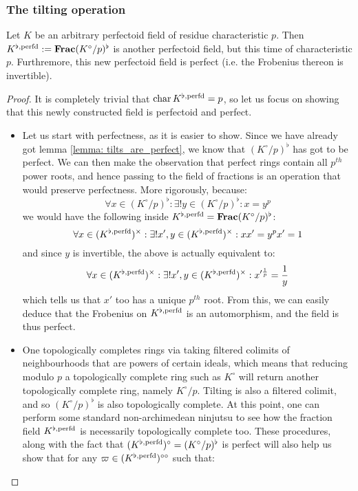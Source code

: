             \subsubsection{The tilting operation}
                \begin{lemma} \label{lemma: tilted_perfectoid_fields_are_perfect}
                    Let $K$ be an arbitrary perfectoid field of residue characteristic $p$. Then $K^{\flat, \mathrm{perfd}} := \mathbf{Frac} (K^{\circ}/p)^{\flat}$ is another perfectoid field, but this time of characteristic $p$. Furthremore, this new perfectoid field is perfect (i.e. the Frobenius thereon is invertible).
                \end{lemma}
                    \begin{proof}
                        It is completely trivial that $\operatorname{char} K^{\flat, \mathrm{perfd}} = p$, so let us focus on showing that this newly constructed field is perfectoid and perfect. 
                            \begin{itemize}
                                \item Let us start with perfectness, as it is easier to show. Since we have already got lemma \ref{lemma: tilts_are_perfect}, we know that $(K^{\circ}/p)^{\flat}$ has got to be perfect. We can then make the observation that perfect rings contain all $p^{th}$ power roots, and hence passing to the field of fractions is an operation that would preserve perfectness. More rigorously, because:
                                    $$\forall x \in (K^{\circ}/p)^{\flat}: \exists! y \in (K^{\circ}/p)^{\flat}: x = y^p$$
                                we would have the following inside $K^{\flat, \mathrm{perfd}} = \mathbf{Frac} (K^{\circ}/p)^{\flat}$:
                                    $$\forall x \in (K^{\flat, \perfd})^{\x}: \exists! x', y \in (K^{\flat, \perfd})^{\x}: x x' = y^p x' = 1$$
                                and since $y$ is invertible, the above is actually equivalent to:
                                    $$\forall x \in (K^{\flat, \perfd})^{\x}: \exists! x', y \in (K^{\flat, \perfd})^{\x}: x'^{\frac1p} = \frac1y$$
                                which tells us that $x'$ too has a unique $p^{th}$ root. From this, we can easily deduce that the Frobenius on $K^{\flat, \mathrm{perfd}}$ is an automorphism, and the field is thus perfect.
                                \item One topologically completes rings via taking filtered colimits of neighbourhoods that are powers of certain ideals, which means that reducing modulo $p$ a topologically complete ring such as $K^{\circ}$ will return another topologically complete ring, namely $K^{\circ}/p$. Tilting is also a filtered colimit, and so $(K^{\circ}/p)^{\flat}$ is also topologically complete. At this point, one can perform some standard non-archimedean ninjutsu to see how the fraction field $K^{\flat, \mathrm{perfd}}$ is necessarily topologically complete too. These procedures, along with the fact that $(K^{\flat, \mathrm{perfd}})^{\circ} = (K^{\circ}/p)^{\flat}$ is perfect will also help us show that for any $\varpi \in (K^{\flat, \mathrm{perfd}})^{\circ \circ}$ such that:

\end{itemize}
\end{proof}
